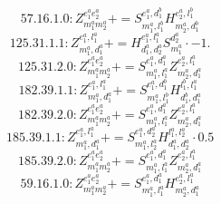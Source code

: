 \documentclass[letterpaper,10pt,fleqn,leqno,onecolumn]{article}
\begin{document}
\begin{equation} \;\;\;\;\;\;  57.16.1.0: Z^{e_{1}^{a}e_{2}^{a}}_{m_{1}^{a}m_{2}^{a}}+=S^{e_{1}^{a},d_{1}^{b}}_{m_{1}^{a},l_{1}^{b}}H^{e_{2}^{a},l_{1}^{b}}_{m_{2}^{a},d_{1}^{b}} \end{equation}
\begin{equation} \;\;\;\;\;\;  125.31.1.1: Z^{e_{1}^{a},l_{1}^{a}}_{m_{1}^{a},d_{1}^{a}}+=H^{e_{1}^{a},l_{1}^{a}}_{d_{1}^{a},d_{2}^{a}}S^{d_{2}^{a}}_{m_{1}^{a}}\cdot -1. \end{equation}
\begin{equation} \;\;\;\;\;\;  125.31.2.0: Z^{e_{1}^{a}e_{2}^{a}}_{m_{1}^{a}m_{2}^{a}}+=S^{e_{1}^{a},d_{1}^{a}}_{m_{1}^{a},l_{1}^{a}}Z^{e_{2}^{a},l_{1}^{a}}_{m_{2}^{a},d_{1}^{a}} \end{equation}
\begin{equation} \;\;\;\;\;\;  182.39.1.1: Z^{e_{1}^{a},l_{1}^{a}}_{m_{1}^{a},d_{1}^{a}}+=S^{e_{1}^{a},d_{1}^{b}}_{m_{1}^{a},l_{1}^{b}}H^{l_{1}^{b},l_{1}^{a}}_{d_{1}^{b},d_{1}^{a}} \end{equation}
\begin{equation} \;\;\;\;\;\;  182.39.2.0: Z^{e_{1}^{a}e_{2}^{a}}_{m_{1}^{a}m_{2}^{a}}+=S^{e_{1}^{a},d_{1}^{a}}_{m_{1}^{a},l_{1}^{a}}Z^{e_{2}^{a},l_{1}^{a}}_{m_{2}^{a},d_{1}^{a}} \end{equation}
\begin{equation} \;\;\;\;\;\;  185.39.1.1: Z^{e_{1}^{a},l_{1}^{a}}_{m_{1}^{a},d_{1}^{a}}+=S^{e_{1}^{a},d_{2}^{a}}_{m_{1}^{a},l_{2}^{a}}H^{l_{1}^{a},l_{2}^{a}}_{d_{1}^{a},d_{2}^{a}}\cdot 0.5 \end{equation}
\begin{equation} \;\;\;\;\;\;  185.39.2.0: Z^{e_{1}^{a}e_{2}^{a}}_{m_{1}^{a}m_{2}^{a}}+=S^{e_{1}^{a},d_{1}^{a}}_{m_{1}^{a},l_{1}^{a}}Z^{e_{2}^{a},l_{1}^{a}}_{m_{2}^{a},d_{1}^{a}} \end{equation}
\begin{equation} \;\;\;\;\;\;  59.16.1.0: Z^{e_{1}^{a}e_{2}^{a}}_{m_{1}^{a}m_{2}^{a}}+=S^{e_{1}^{a},d_{1}^{a}}_{m_{1}^{a},l_{1}^{a}}H^{e_{2}^{a},l_{1}^{a}}_{m_{2}^{a},d_{1}^{a}} \end{equation}
\end{document}
